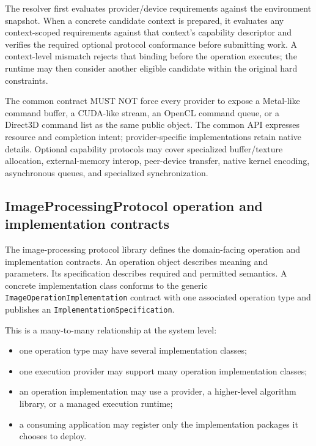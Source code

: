 \documentclass[11pt,a4paper,oneside]{article}
\begin{document}
The resolver first evaluates provider/device requirements against the environment snapshot. When a concrete candidate context is prepared, it evaluates any context-scoped requirements against that context's capability descriptor and verifies the required optional protocol conformance before submitting work. A context-level mismatch rejects that binding before the operation executes; the runtime may then consider another eligible candidate within the original hard constraints.

The common contract MUST NOT force every provider to expose a Metal-like command buffer, a CUDA-like stream, an OpenCL command queue, or a Direct3D command list as the same public object. The common API expresses resource and completion intent; provider-specific implementations retain native details. Optional capability protocols may cover specialized buffer/texture allocation, external-memory interop, peer-device transfer, native kernel encoding, asynchronous queues, and specialized synchronization.

\subsection{ImageProcessingProtocol operation and implementation contracts}

The image-processing protocol library defines the domain-facing operation and implementation contracts. An operation object describes meaning and parameters. Its specification describes required and permitted semantics. A concrete implementation class conforms to the generic \texttt{ImageOperationImplementation} contract with one associated operation type and publishes an \texttt{ImplementationSpecification}.

This is a many-to-many relationship at the system level:
\begin{itemize}
  \item one operation type may have several implementation classes;
  \item one execution provider may support many operation implementation classes;
  \item an operation implementation may use a provider, a higher-level algorithm library, or a managed execution runtime;
  \item a consuming application may register only the implementation packages it chooses to deploy.
\end{itemize}
\end{document}

